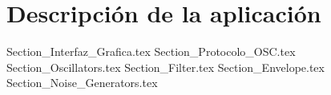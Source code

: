 \chapter{Descripción de la aplicación}

	{Section_Interfaz_Grafica.tex}
	{Section_Protocolo_OSC.tex}
	{Section_Oscillators.tex}
	{Section_Filter.tex}	
	{Section_Envelope.tex}	
	{Section_Noise_Generators.tex}
